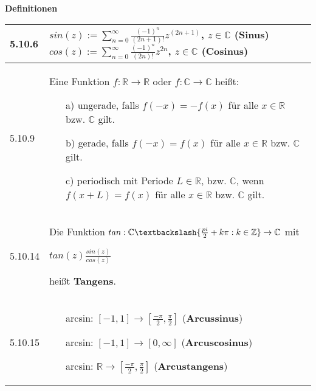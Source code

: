     \noindent
    \textbf{Definitionen}
    \begin{table}[H]  
    \begin{tabularx}{\textwidth}{X m{16cm}}
        \toprule

        5.10.6& $sin(z) := \sum^{\infty}_{n=0} \frac{(-1)^n}{(2n+1)!} z^(2n+1)$, $z \in \mathbb{C}$ (\textbf{Sinus}) \hfill \break
                $cos(z) := \sum^{\infty}_{n=0} \frac{(-1)^n}{(2n)!}z^{2n}$, $z \in \mathbb{C}$ (\textbf{Cosinus}) \\
        \midrule
        5.10.9& Eine Funktion $f: \mathbb{R} \rightarrow \mathbb{R}$ oder $f: \mathbb{C} \rightarrow \mathbb{C}$ heißt: 
                \begin{itemize}[topsep=-0.5cm]
                    \item[a)] ungerade, falls $f(-x) = -f(x)$ für alle $x \in \mathbb{R}$ bzw. $\mathbb{C}$ gilt.
                    \item[b)] gerade, falls $f(-x) = f(x)$ für alle $x \in \mathbb{R}$ bzw. $\mathbb{C}$ gilt.
                    \item[c)] periodisch mit Periode $L \in \mathbb{R}$, bzw. $\mathbb{C}$, wenn $f(x+L) = f(x)$ für alle $x \in \mathbb{R}$ bzw. $\mathbb{C}$ gilt.
                \end{itemize} \vspace{-0cm}\\
        \midrule
        5.10.14&Die Funktion $tan: \mathbb{C} \textbackslash \{\frac{pi}{2}+k\pi:k \in \mathbb{Z}\} \rightarrow \mathbb{C}$ mit \hfill \break
                \centerline{$tan(z) \frac{sin(z)}{cos(z)}$}
                heißt \textbf{Tangens}. \\
        \midrule
        5.10.15&\begin{itemize}
                    \item[] arcsin: $[-1,1] \rightarrow [\frac{-\pi}{2},\frac{\pi}{2}]$ (\textbf{Arcussinus})
                    \item[] arcsin: $[-1,1] \rightarrow [0, \infty]$ (\textbf{Arcuscosinus})
                    \item[] arcsin: $\mathbb{R} \rightarrow [\frac{-\pi}{2},\frac{\pi}{2}]$ (\textbf{Arcustangens})
                \end{itemize} \\

        \bottomrule

    \end{tabularx}
    \end{table}

